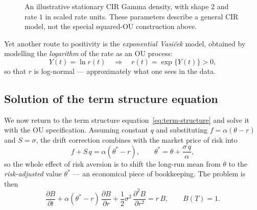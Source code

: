 \begin{figure}[h!]
\centering
{}
\caption{An illustrative stationary CIR Gamma density, with shape $2$ and rate $1$ in scaled rate units.
These parameters describe a general CIR model, not the special squared-OU construction above.}
\label{fig:cir-chi2}
\end{figure}

Yet another route to positivity is the \emph{exponential Vasi\v{c}ek} model, obtained by modelling the \emph{logarithm} of the rate as an OU process:
\begin{equation}
Y(t) = \ln r(t) \quad\Longrightarrow\quad r(t) = \exp\{Y(t)\} > 0,
\end{equation}
so that $r$ is log-normal --- approximately what one sees in the data.

\subsection{Solution of the term structure equation}\label{sec:vasicek-term-structure}

We now return to the term structure equation~\eqref{eq:term-structure} and solve it with the OU specification.
Assuming constant $q$ and substituting $f = \alpha(\theta-r)$ and $S=\sigma$, the drift correction combines with the market price of risk into
\begin{equation}
f + S\,q = \alpha(\theta^* - r),
\qquad
\theta^* = \theta + \frac{\sigma\,q}{\alpha},
\end{equation}
so the whole effect of risk aversion is to shift the long-run mean from $\theta$ to the \emph{risk-adjusted} value $\theta^*$ --- an economical piece of bookkeeping.
The problem is then
\begin{equation}
\frac{\partial B}{\partial t} + \alpha(\theta^*-r)\,\frac{\partial B}{\partial r} + \frac{1}{2}\sigma^2\,\frac{\partial^2 B}{\partial r^2} = r\, B, \qquad B(T) = 1.
\end{equation}

